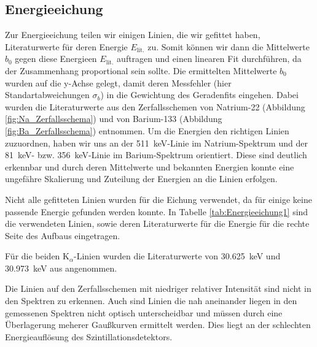 \subsection{Energieeichung}

Zur Energieeichung teilen wir einigen Linien, die wir gefittet haben, Literaturwerte für deren Energie $E_\text{lit.}$ zu.
Somit können wir dann die Mittelwerte $b_0$ gegen diese Energieen $E_\text{lit.}$ auftragen und einen linearen Fit durchführen, da der Zusammenhang proportional sein sollte.
Die ermittelten Mittelwerte $b_0$ wurden auf die y-Achse gelegt, damit deren Messfehler (hier Standartabweichungen $\sigma_b$) in die Gewichtung des Geradenfits eingehen.
Dabei wurden die Literaturwerte aus den Zerfallsschemen von Natrium-22 (Abbildung \ref{fig:Na_Zerfallsschema}) und von Barium-133 (Abbildung \ref{fig:Ba_Zerfallsschema}) entnommen.
Um die Energien den richtigen Linien zuzuordnen, haben wir uns an der \SI{511}{\kilo\eV}-Linie im Natrium-Spektrum und der \SI{81}{\kilo\eV}- bzw. \SI{356}{\kilo\eV}-Linie im Barium-Spektrum orientiert.
Diese sind deutlich erkennbar und durch deren Mittelwerte und bekannten Energien konnte eine ungefähre Skalierung und Zuteilung der Energien an die Linien erfolgen.

Nicht alle gefitteten Linien wurden für die Eichung verwendet, da für einige keine passende Energie gefunden werden konnte.
In Tabelle \ref{tab:Energieeichung1} sind die verwendeten Linien, sowie deren Literaturwerte für die Energie für die rechte Seite des Aufbaus eingetragen.

Für die beiden K$_\alpha$-Linien wurden die Literaturwerte von \SI{30.625}{\kilo\eV} und \SI{30.973}{\kilo\eV} aus \cite{KalphaEnergie} angenommen.

Die Linien auf den Zerfallsschemen mit niedriger relativer Intensität sind nicht in den Spektren zu erkennen.
Auch sind Linien die nah aneinander liegen in den gemessenen Spektren nicht optisch unterscheidbar und müssen durch eine Überlagerung meherer Gaußkurven ermittelt werden.
Dies liegt an der schlechten Energieauflösung des Szintillationsdetektors.

